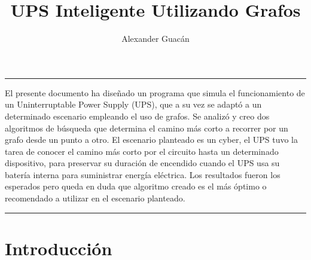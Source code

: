 \documentclass[runningheads]{llncs}
\title{UPS Inteligente Utilizando Grafos}
\author{Alexander Guacán\orcidID{L00412289}}
\institute{Universidad de las Fuerzas Armadas\\
\email{adguacan@espe.edu.ec}}
\renewenvironment{abstract}
{\quotation\small\noindent\rule{\linewidth}{.5pt}\par\smallskip
{\centering\bfseries\abstractname\par}\medskip}
{\par\noindent\rule{\linewidth}{.5pt}\endquotation}
\begin{document}
    \maketitle

    \begin{abstract}

        El presente documento ha diseñado un programa que simula el funcionamiento de un Uninterruptable Power Supply (UPS), que a su vez se adaptó a un determinado escenario empleando el uso de grafos. Se analizó y creo dos algoritmos de búsqueda que determina el camino más corto a recorrer por un grafo desde un punto a otro. El escenario planteado es un cyber, el UPS tuvo la tarea de conocer el camino más corto por el circuito hasta un determinado dispositivo, para preservar su duración de encendido cuando el UPS usa su batería interna para suministrar energía eléctrica. Los resultados fueron los esperados pero queda en duda que algoritmo creado es el más óptimo o recomendado a utilizar en el escenario planteado.
        
    \end{abstract}

    \section{Introducción}
\end{document}
